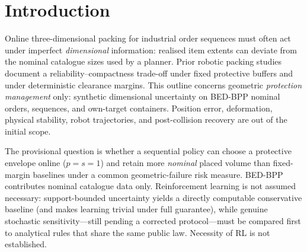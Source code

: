 \section{Introduction}

Online three-dimensional packing for industrial order sequences must often act
under imperfect \emph{dimensional} information: realised item extents can
deviate from the nominal catalogue sizes used by a planner. Prior robotic
packing studies document a reliability--compactness trade-off under fixed
protective buffers and under deterministic clearance margins. This outline
concerns geometric \emph{protection management} only: synthetic dimensional
uncertainty on BED-BPP nominal orders, sequences, and own-target containers.
Position error, deformation, physical stability, robot trajectories, and
post-collision recovery are out of the initial scope.

The provisional question is whether a sequential policy can choose a
protective envelope online ($p=s=1$) and retain more \emph{nominal} placed
volume than fixed-margin baselines under a common geometric-failure risk
measure. BED-BPP contributes nominal catalogue data only. Reinforcement
learning is not assumed necessary: support-bounded uncertainty yields a
directly computable conservative baseline (and makes learning trivial under
full guarantee), while genuine stochastic sensitivity---still pending a
corrected protocol---must be compared first to analytical rules that share
the same public law. Necessity of RL is not established.
